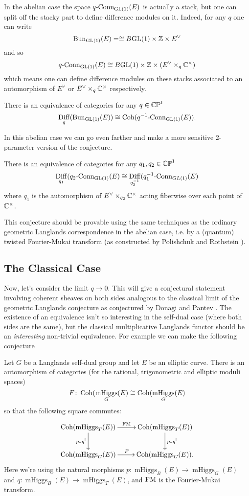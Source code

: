 \documentclass[10pt, oneside]{article}
\DeclareMathOperator{\mhiggs}{mHiggs}
\newcommand{\qconn}{q\text{-Conn}}
\renewcommand{\conn}{\text{-Conn}}
\DeclareMathOperator{\diff}{Diff}
\begin{document}
In the abelian case the space $\qconn_{\GL(1)}(E)$ is actually a stack, but one can split off the stacky part to define difference modules on it.  Indeed, for any $q$ one can write
\[\operatorname{Bun}_{\mathrm{GL}(1)}(E) = \cong B\mathrm{GL}(1) \times \mathbb{Z} \times E^\vee\]
and so
\[\qconn_{\GL(1)}(E) \iso B\GL(1) \times \ZZ \times (E^\vee \times_q \CC^\times)\]
which means one can define difference modules on these stacks associated to an automorphism of $E^\vee$ or $E^\vee \times_q \mathbb{C}^\times$ respectively.

\begin{conjecture}
There is an equivalence of categories for any $q \in \mathbb{CP}^1$
\[\diff_q(\bun_{\GL(1)}(E)) \iso \coh(q^{-1}\conn_{\GL(1)}(E)).\]
\end{conjecture}

In this abelian case we can go even farther and make a more sensitive 2-parameter version of the conjecture.

\begin{conjecture}
There is an equivalence of categories for any $q_1, q_2 \in \mathbb{CP}^1$
\[\diff_{q_1}(q_2\conn_{\GL(1)}(E) \iso \diff_{q_2^{-1}}(q_1^{-1}\conn_{GL(1)}(E)\]
where $q_1$ is the automorphism of $E^\vee \times_{q_2} \mathbb{C}^\times$ acting fiberwise over each point of $\mathbb{C}^\times$.
\end{conjecture}

This conjecture should be provable using the same techniques as the ordinary geometric Langlands correspondence in the abelian case, i.e. by a (quantum) twisted Fourier-Mukai transform (as constructed by Polishchuk and Rothstein \cite{PolishchukRothstein}).

\subsection{The Classical Case}
Now, let's consider the limit $q \to 0$.  This will give a conjectural statement involving coherent sheaves on both sides analogous to the classical limit of the geometric Langlands conjecture as conjectured by Donagi and Pantev \cite{DonagiPantev}.  The existence of an equivalence isn't so interesting in the self-dual case (where both sides are the same), but the classical multiplicative Langlands functor should be an \emph{interesting} non-trivial equivalence.  For example we can make the following conjecture

\begin{conjecture}
Let $G$ be a Langlands self-dual group and let $E$ be an elliptic curve.  There is an automorphism of categories (for the rational, trigonometric and elliptic moduli spaces)
\[F \colon \coh(\mhiggs_G(E) \iso \coh(\mhiggs_{G}(E)\]
so that the following square commutes:
\[\xymatrix{
\coh(\mhiggs_T(E)) \ar[r]^{\mathrm{FM}} \ar[d]_{p_*q^!} &\coh(\mhiggs_T(E)) \ar[d]^{p_*q^!} \\
\coh(\mhiggs_G(E)) \ar[r]^{F} &\coh(\mhiggs_G(E)).
}\]
Here we're using the natural morphisms $p \colon \mhiggs_B(E) \to \mhiggs_G(E)$ and $q \colon \mhiggs_B(E) \to \mhiggs_T(E)$, and $\mathrm{FM}$ is the Fourier-Mukai transform.
\end{conjecture}
\end{document}
